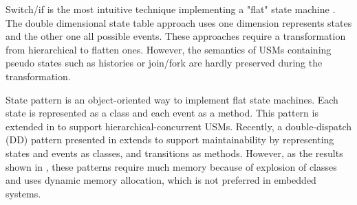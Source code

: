 Switch/if is the most intuitive technique implementing a "flat" state machine \cite{Booch1998}. 
The double dimensional state table approach \cite{Douglass1999} uses one dimension represents states and the other one all possible events. 
These approaches require a transformation from hierarchical to flatten ones. 
However, the semantics of USMs containing pseudo states such as histories or join/fork are hardly preserved during the transformation.  

State pattern \cite{Shalyto2006,Douglass1999} is an object-oriented way to implement flat state machines. Each state is represented as a class and each event as a method. %
This pattern is extended in \cite{niaz_mapping_2004} to support hierarchical-concurrent USMs. 
Recently, a double-dispatch (DD) pattern presented in \cite{spinke_object-oriented_2013} extends \cite{niaz_mapping_2004} to support maintainability by %
representing states and events as classes, and transitions as methods. 
However, as the results shown in \cite{spinke_object-oriented_2013}, these patterns require much memory because of explosion of classes and uses dynamic memory allocation, which is not preferred in embedded systems.

